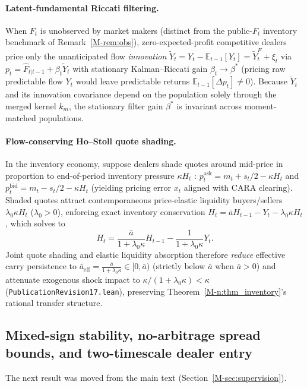 \documentclass[12pt]{article}
\theoremstyle{definition}
\theoremstyle{remark}
\newcommand{\E}{\mathbb{E}}
\begin{document}
\paragraph{Latent-fundamental Riccati filtering.}
When $F_t$ is unobserved by market makers (distinct from the public-$F_t$ inventory benchmark of Remark~\ref{M-rem:obs}), zero-expected-profit competitive dealers price only the unanticipated flow \emph{innovation} $\tilde{Y}_t = Y_t - \E_{t-1}[Y_t] = \tilde{Y}_t^F + \xi_t$ via $p_t = \hat{F}_{t|t-1} + \beta_t \tilde{Y}_t$ with stationary Kalman--Riccati gain $\beta_t \to \beta^*$ (pricing raw predictable flow $Y_t$ would leave predictable returns $\E_{t-1}[\Delta p_t] \neq 0$). Because $\tilde{Y}_t$ and its innovation covariance depend on the population solely through the merged kernel $k_m$, the stationary filter gain $\beta^*$ is invariant across moment-matched populations.

\paragraph{Flow-conserving Ho--Stoll quote shading.}
In the inventory economy, suppose dealers shade quotes around mid-price in proportion to end-of-period inventory pressure $\kappa H_t$ \citep{ho1981,avellaneda2008}: $p_t^{\mathrm{ask}} = m_t + s_t/2 - \kappa H_t$ and $p_t^{\mathrm{bid}} = m_t - s_t/2 - \kappa H_t$ (yielding pricing error $x_t$ aligned with CARA clearing). Shaded quotes attract contemporaneous price-elastic liquidity buyers/sellers $\lambda_0 \kappa H_t$ ($\lambda_0 > 0$), enforcing exact inventory conservation $H_t = \bar{a} H_{t-1} - Y_t - \lambda_0 \kappa H_t$, which solves to
\[
  H_t = \frac{\bar{a}}{1 + \lambda_0 \kappa} H_{t-1} - \frac{1}{1 + \lambda_0 \kappa} Y_t.
\]
Joint quote shading and elastic liquidity absorption therefore \emph{reduce} effective carry persistence to $\bar{a}_{\mathrm{eff}} = \frac{\bar{a}}{1 + \lambda_0 \kappa} \in [0, \bar{a})$ (strictly below $\bar{a}$ when $\bar{a} > 0$) and attenuate exogenous shock impact to $\kappa / (1 + \lambda_0 \kappa) < \kappa$ (\nolinkurl{PublicationRevision17.lean}), preserving Theorem~\ref{M-n:thm_inventory}'s rational transfer structure.

\subsection{Mixed-sign stability, no-arbitrage spread bounds, and two-timescale dealer entry}\label{sec:mixed_sign}

\noindent The next result was moved from the main text (Section~\ref{M-sec:supervision}).
\end{document}
